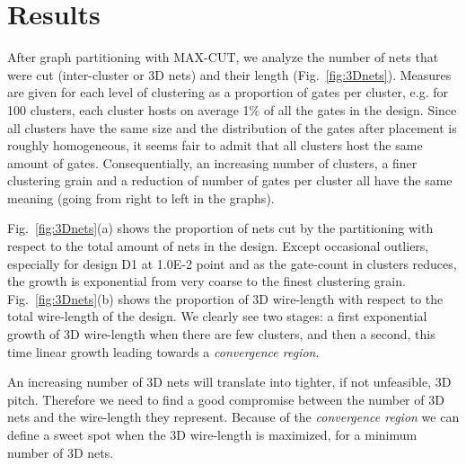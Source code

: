 \documentclass[conference]{IEEEtran}
\begin{document}
\section{Results}\label{sec:res}
After graph partitioning with MAX-CUT, we analyze the number of nets that were cut (inter-cluster or 3D nets) and their length (Fig.~\ref{fig:3Dnets}). Measures are given for each level of clustering as a proportion of gates per cluster, e.g. for 100 clusters, each cluster hosts on average 1\% of all the gates in the design. Since all clusters have the same size and the distribution of the gates after placement is roughly homogeneous, it seems fair to admit that all clusters host the same amount of gates. Consequentially, an increasing number of clusters, a finer clustering grain and a reduction of number of gates per cluster all have the same meaning (going from right to left in the graphs).

Fig.~\ref{fig:3Dnets}(a) shows the proportion of nets cut by the partitioning with respect to the total amount of nets in the design. Except occasional outliers, especially for design D1 at 1.0E-2 point and as the gate-count in clusters reduces, the growth is exponential from very coarse to the finest clustering grain. Fig.~\ref{fig:3Dnets}(b) shows the proportion of 3D wire-length with respect to the total wire-length of the design. We clearly see two stages: a first exponential growth of 3D wire-length when there are few clusters, and then a second, this time linear growth leading towards a \textit{convergence region}.

An increasing number of 3D nets will translate into tighter, if not unfeasible, 3D pitch. Therefore we need to find a good compromise between the number of 3D nets and the wire-length they represent. Because of the \textit{convergence region} we can define a sweet spot when the 3D wire-length is maximized, for a minimum number of 3D nets.
\end{document}
